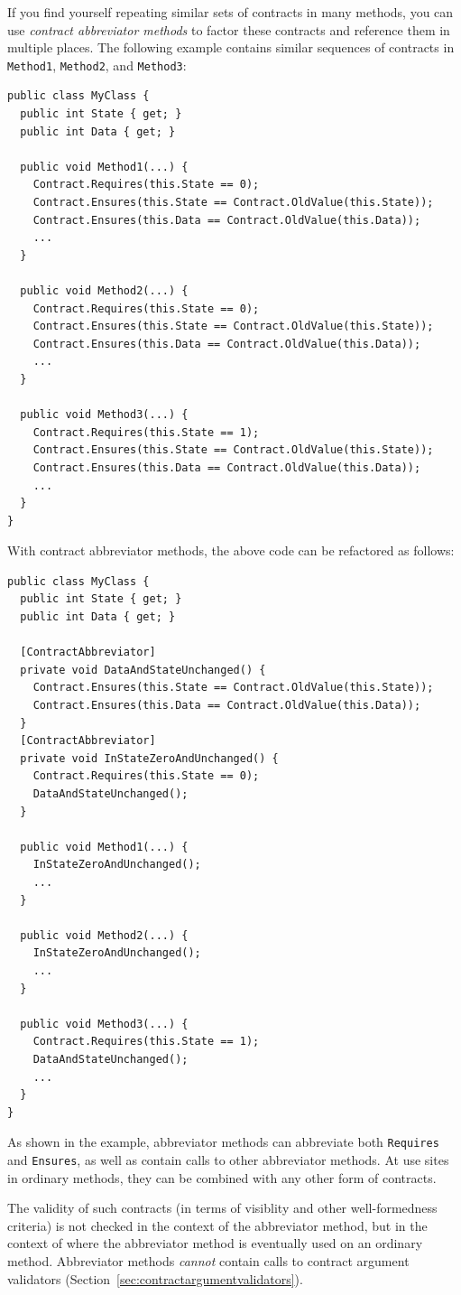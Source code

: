 \documentclass{article}
\newcommand{\code}[1]{\lstinline{#1}}
\begin{document}
\noindent 
If you find yourself repeating similar sets of contracts in
many methods, you can use \emph{contract abbreviator methods} to
factor these contracts and reference them in multiple places. The
following example contains similar sequences of contracts in
\code{Method1}, \code{Method2}, and \code{Method3}:
\begin{lstlisting}
public class MyClass {
  public int State { get; }
  public int Data { get; }

  public void Method1(...) {
    Contract.Requires(this.State == 0);
    Contract.Ensures(this.State == Contract.OldValue(this.State));
    Contract.Ensures(this.Data == Contract.OldValue(this.Data));
    ...
  }

  public void Method2(...) {
    Contract.Requires(this.State == 0);
    Contract.Ensures(this.State == Contract.OldValue(this.State));
    Contract.Ensures(this.Data == Contract.OldValue(this.Data));
    ...
  }

  public void Method3(...) {
    Contract.Requires(this.State == 1);
    Contract.Ensures(this.State == Contract.OldValue(this.State));
    Contract.Ensures(this.Data == Contract.OldValue(this.Data));
    ...
  }
}
\end{lstlisting}
With contract abbreviator methods, the above code can be
refactored as follows:
\begin{lstlisting}
public class MyClass {
  public int State { get; }
  public int Data { get; }

  [ContractAbbreviator]
  private void DataAndStateUnchanged() {
    Contract.Ensures(this.State == Contract.OldValue(this.State));
    Contract.Ensures(this.Data == Contract.OldValue(this.Data));
  }
  [ContractAbbreviator]
  private void InStateZeroAndUnchanged() {
    Contract.Requires(this.State == 0);
    DataAndStateUnchanged();
  }

  public void Method1(...) {
    InStateZeroAndUnchanged();
    ...
  }

  public void Method2(...) {
    InStateZeroAndUnchanged();
    ...
  }

  public void Method3(...) {
    Contract.Requires(this.State == 1);
    DataAndStateUnchanged();
    ...
  }
}
\end{lstlisting}
As shown in the example, abbreviator methods can abbreviate both
\code{Requires} and \code{Ensures}, as well as contain calls to other
abbreviator methods. At use sites in ordinary methods, they can be
combined with any other form of contracts.

The validity of such contracts (in
terms of visiblity and other well-formedness criteria) is not checked
in the context of the abbreviator method, but in the context of where
the abbreviator method is eventually used on an ordinary method.
Abbreviator methods \emph{cannot} contain calls to {contract argument
validators} (Section~\ref{sec:contractargumentvalidators}).
\end{document}
